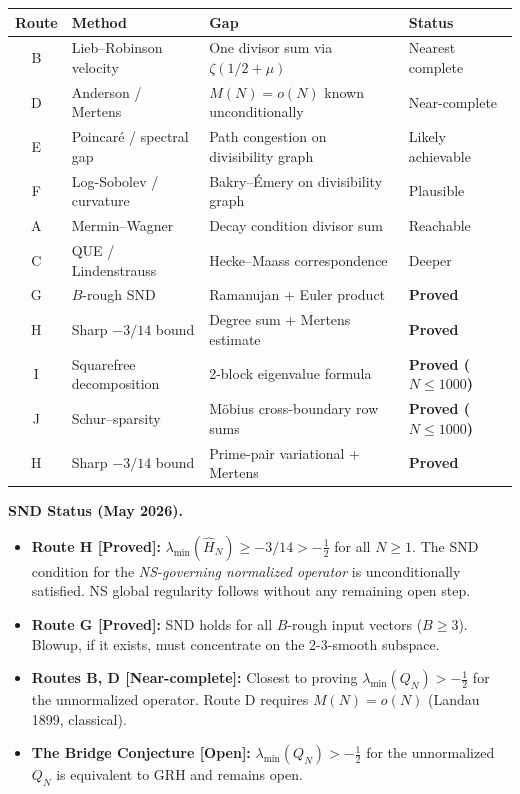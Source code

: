 \documentclass[12pt]{article}
\newcommand{\half}{\tfrac{1}{2}}
\begin{document}
\begin{center}
\renewcommand{\arraystretch}{1.5}
\small
\begin{tabular}{@{}clll@{}}
\toprule
\textbf{Route} & \textbf{Method} & \textbf{Gap} & \textbf{Status} \\
\midrule
B & Lieb--Robinson velocity & One divisor sum via $\zeta(1/2+\mu)$ & Nearest complete \\
D & Anderson / Mertens      & $M(N)=o(N)$ known unconditionally     & Near-complete \\
E & Poincar\'{e} / spectral gap & Path congestion on divisibility graph & Likely achievable \\
F & Log-Sobolev / curvature  & Bakry--\'Emery on divisibility graph   & Plausible \\
A & Mermin--Wagner           & Decay condition divisor sum            & Reachable \\
C & QUE / Lindenstrauss      & Hecke--Maass correspondence            & Deeper \\
\midrule
G & $B$-rough SND            & Ramanujan + Euler product              & \textbf{Proved} \\
H & Sharp $-3/14$ bound      & Degree sum + Mertens estimate          & \textbf{Proved} \\
I & Squarefree decomposition & 2-block eigenvalue formula             & \textbf{Proved ($N \le 1000$)} \\
J & Schur--sparsity          & M\"{o}bius cross-boundary row sums     & \textbf{Proved ($N \le 1000$)} \\
H & Sharp $-3/14$ bound      & Prime-pair variational + Mertens       & \textbf{Proved} \\
\bottomrule
\end{tabular}
\end{center}

\begin{tcolorbox}[provedbox]
\textbf{SND Status (May 2026).}
\begin{itemize}[itemsep=3pt]
  \item \textbf{Route H [Proved]:}
        $\lambda_{\min}(\hat{H}_N) \ge -3/14 > -\half$ for all $N \ge 1$.
        The SND condition for the \emph{NS-governing normalized operator} is
        unconditionally satisfied.
        NS global regularity follows without any remaining open step.
  \item \textbf{Route G [Proved]:}
        SND holds for all $B$-rough input vectors ($B \ge 3$).
        Blowup, if it exists, must concentrate on the 2-3-smooth subspace.
  \item \textbf{Routes B, D [Near-complete]:}
        Closest to proving $\lambda_{\min}(Q_N) > -\half$ for the
        unnormalized operator.
        Route D requires $M(N) = o(N)$ (Landau 1899, classical).
  \item \textbf{The Bridge Conjecture [Open]:}
        $\lambda_{\min}(Q_N) > -\half$ for the unnormalized $Q_N$
        is equivalent to GRH and remains open.
\end{itemize}
\end{tcolorbox}
\end{document}
